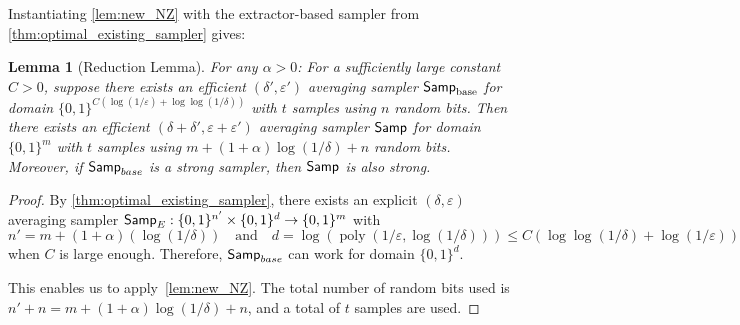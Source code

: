 \documentclass[11pt,letterpaper]{article}
\newtheorem{lemma}[theorem]{Lemma}
\DeclareMathOperator*{\poly}{poly}
\newcommand{\eps}{\varepsilon}
\newcommand{\1}{\mathbbm{1}}
\newcommand{\zo}{\{0, 1\}}
\newcommand{\Smp}{\textup{\textsf{Samp}}}
\begin{document}
Instantiating \cref{lem:new_NZ} with the extractor-based sampler from \cref{thm:optimal_existing_sampler} gives:

\begin{lemma}[Reduction Lemma]
\label{lem:one_step_reduction}
    For any $\alpha > 0$: For a sufficiently large constant $C > 0$,  suppose there exists an efficient $({\delta'}, \eps')$ averaging sampler $\Smp_{\text{base}}$ for domain $\zo^{C(\log (1 / \eps) + \log\log(1 / \delta))}$ with $t$ samples using $n$ random bits. Then there exists an efficient $(\delta + \delta', \eps + \eps')$ averaging sampler $\Smp$ for domain $\zo^m$ with $t$ samples using 
        $m + (1 + \alpha)\log (1 / \delta) + n$
        random bits. Moreover, if $\Smp_{base}$ is a strong sampler, then $\Smp$ is also strong.
\end{lemma}

\begin{proof}
    By \cref{thm:optimal_existing_sampler}, there exists an explicit $(\delta, \eps)$ averaging sampler $\Smp_{E}: \zo^{n'} \times \zo^d \to \zo^m$ with \[
        n' = {m + (1 + \alpha)(\log (1 / \delta))} \quad \text{and} \quad  d = \log (\poly(1 / \eps, \log (1 / \delta))) \le  C(\log\log (1 / \delta) + \log (1/\eps))\]
        when $C$ is large enough.
    Therefore, $\Smp_{base}$ can work for domain $\zo^d$. 


    This enables us to apply~\cref{lem:new_NZ}. The total number of random bits used is $n' + n = m + (1 + \alpha)\log (1 / \delta) + n$, and a total of $t$ samples are used.

    



\end{proof}
\end{document}
